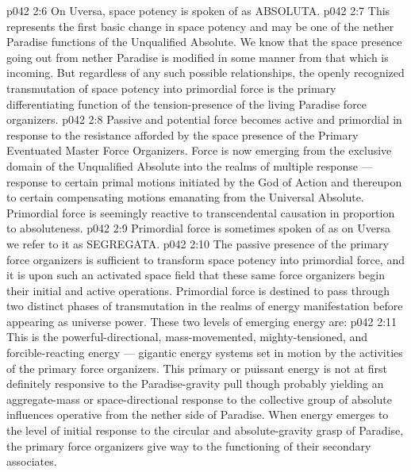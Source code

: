 \vs p042 2:6 On Uversa, space potency is spoken of as ABSOLUTA.
\vs p042 2:7 \pc {}\bibnobreakspace {} This represents the first basic change in space potency and may be one of the nether Paradise functions of the Unqualified Absolute. We know that the space presence going out from nether Paradise is modified in some manner from that which is incoming. But regardless of any such possible relationships, the openly recognized transmutation of space potency into primordial force is the primary differentiating function of the tension\hyp{}presence of the living Paradise force organizers.
\vs p042 2:8 Passive and potential force becomes active and primordial in response to the resistance afforded by the space presence of the Primary Eventuated Master Force Organizers. Force is now emerging from the exclusive domain of the Unqualified Absolute into the realms of multiple response --- response to certain primal motions initiated by the God of Action and thereupon to certain compensating motions emanating from the Universal Absolute. Primordial force is seemingly reactive to transcendental causation in proportion to absoluteness.
\vs p042 2:9 Primordial force is sometimes spoken of as  on Uversa we refer to it as SEGREGATA.
\vs p042 2:10 \pc {}\bibnobreakspace {} The passive presence of the primary force organizers is sufficient to transform space potency into primordial force, and it is upon such an activated space field that these same force organizers begin their initial and active operations. Primordial force is destined to pass through two distinct phases of transmutation in the realms of energy manifestation before appearing as universe power. These two levels of emerging energy are:
\vs p042 2:11 \pc {}\bibnobreakspace {} This is the powerful\hyp{}directional, mass\hyp{}movemented, mighty\hyp{}tensioned, and forcible\hyp{}reacting energy --- gigantic energy systems set in motion by the activities of the primary force organizers. This primary or puissant energy is not at first definitely responsive to the Paradise\hyp{}gravity pull though probably yielding an aggregate\hyp{}mass or space\hyp{}directional response to the collective group of absolute influences operative from the nether side of Paradise. When energy emerges to the level of initial response to the circular and absolute\hyp{}gravity grasp of Paradise, the primary force organizers give way to the functioning of their secondary associates.
